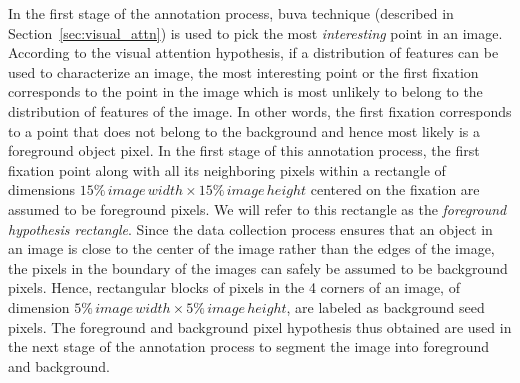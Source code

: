 \documentclass {udthesis}
\begin{document}
In the first stage of the annotation process, \gls{buva} technique (described in Section~\ref{sec:visual_attn}) is used to pick the most \textit{interesting} point in an image. According to the visual attention hypothesis, if a distribution of features can be used to characterize an image, the most interesting point or the first fixation corresponds to the point in the image which is most unlikely to belong to the distribution of features of the image. In other words, the first fixation corresponds to a point that does not belong to the background and hence most likely is a foreground object pixel. In the first stage of this annotation process, the first fixation point along with all its neighboring pixels within a rectangle of dimensions $15\% \,image\, width \times 15\% \,image\, height$ centered on the fixation are assumed to be foreground pixels. We will refer to this rectangle as the \textit{foreground hypothesis rectangle}.
Since the data collection  process ensures that an object in an image is close to the center of the image rather than the edges of the image, the pixels in the boundary of the images can safely be assumed to be background pixels. Hence, rectangular blocks of pixels in the 4 corners of an image, of dimension $5\% \,image\, width \times 5\% \,image\, height$, are labeled as background seed pixels. The foreground and background pixel hypothesis thus obtained are used in the next stage of the annotation process to segment the image into foreground and background.
\end{document}
